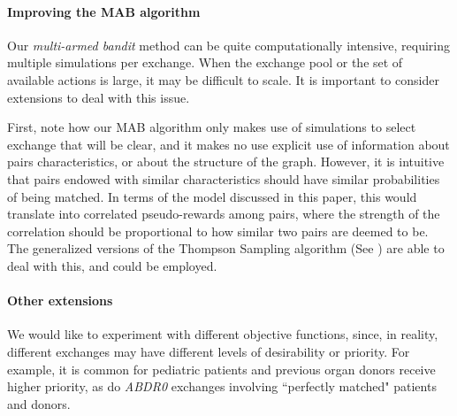 \paragraph{Improving the MAB algorithm}

Our \emph{multi-armed bandit} method can be quite computationally intensive, requiring multiple simulations per exchange. When the exchange pool or the set of available actions is large, it may be difficult to scale. It is important to consider extensions to deal with this issue.

First, note how our MAB algorithm only makes use of simulations to select exchange that will be clear, and it makes no use explicit use of information about pairs characteristics, or about the structure of the graph. However, it is intuitive that pairs endowed with similar characteristics should have similar probabilities of being matched. In terms of the model discussed in this paper, this would translate into correlated pseudo-rewards among pairs, where the strength of the correlation should be proportional to how similar two pairs are deemed to be. The generalized versions of the Thompson Sampling algorithm (See \citet{russo2017tutorial}) are able to deal with this, and could be employed.

% 
% 
% 
% 
% 


\paragraph{Other extensions} We would like to experiment with different objective functions, since, in reality, different exchanges may have different levels of desirability or priority. For example, it is common for pediatric patients and previous organ donors receive higher priority, as do \emph{ABDR0} exchanges involving ``perfectly matched" patients and donors.



